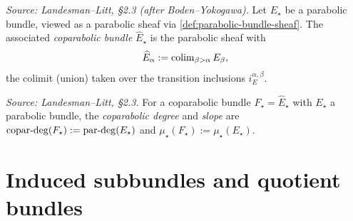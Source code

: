 \begin{definition}
  \label{def:coparabolic-bundle}
  \textit{Source: Landesman--Litt, \S2.3 (after Boden--Yokogawa).}
  Let $E_\star$ be a parabolic bundle, viewed as a parabolic sheaf via
  \cref{def:parabolic-bundle-sheaf}. The associated \emph{coparabolic bundle}
  $\widehat{E}_\star$ is the parabolic sheaf with
  \[
    \widehat{E}_\alpha := \operatorname{colim}_{\beta > \alpha} E_\beta ,
  \]
  the colimit (union) taken over the transition inclusions $i^{\alpha,\beta}_E$.
\end{definition}

\begin{definition}
  \label{def:copar-degree}
  \textit{Source: Landesman--Litt, \S2.3.}
  For a coparabolic bundle $F_\star = \widehat{E}_\star$ with $E_\star$ a
  parabolic bundle, the \emph{coparabolic degree} and \emph{slope} are
  $\operatorname{copar\text{-}deg}(F_\star) := \operatorname{par\text{-}deg}(E_\star)$ and
  $\mu_\star(F_\star) := \mu_\star(E_\star)$.
\end{definition}

\section{Induced subbundles and quotient bundles}
\label{sec:induced-subbundle}

